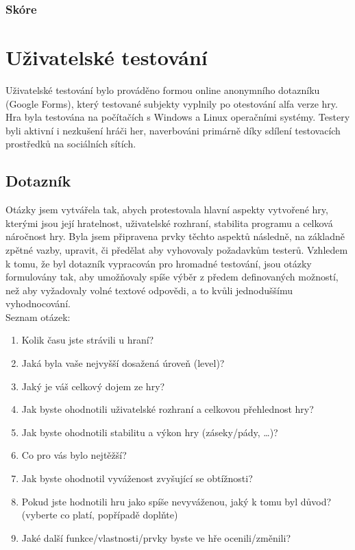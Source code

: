 \subsection*{Skóre}

\chapter{Uživatelské testování}
Uživatelské testování bylo prováděno formou online anonymního dotazníku (Google Forms), který testované subjekty vyplnily po otestování alfa verze hry. Hra byla testována na počítačích s Windows a Linux operačními systémy. Testery byli aktivní i nezkušení hráči her, naverbováni primárně díky sdílení testovacích prostředků na sociálních sítích.

\section{Dotazník}
Otázky jsem vytvářela tak, abych protestovala hlavní aspekty vytvořené hry, kterými jsou její hratelnost, uživatelské rozhraní, stabilita programu a celková náročnost hry. Byla jsem připravena prvky těchto aspektů následně, na základně zpětné vazby, upravit, či předělat aby vyhovovaly požadavkům testerů. Vzhledem k tomu, že byl dotazník vypracován pro hromadné testování, jsou otázky formulovány tak, aby umožňovaly spíše výběr z předem definovaných možností, než aby vyžadovaly volné textové odpovědi, a to kvůli jednoduššímu vyhodnocování. \\
\newline
\noindent Seznam otázek:
\begin{enumerate}
\item Kolik času jste strávili u hraní?
\item Jaká byla vaše nejvyšší dosažená úroveň (level)?
\item Jaký je váš celkový dojem ze hry?
\item Jak byste ohodnotili uživatelské rozhraní a celkovou přehlednost hry?
\item Jak byste ohodnotili stabilitu a výkon hry (záseky/pády, \ldots)?
\item Co pro vás bylo nejtěžší?
\item Jak byste ohodnotil vyváženost zvyšující se obtížnosti?
\item Pokud jste hodnotili hru jako spíše nevyváženou, jaký k tomu byl důvod? (vyberte co platí, popřípadě doplňte)
\item Jaké další funkce/vlastnosti/prvky byste ve hře ocenili/změnili?
\end{enumerate}

